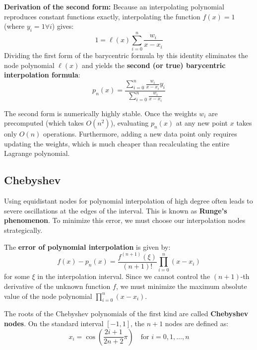 \begin{theorem}
    \textbf{Derivation of the second form:} Because an interpolating polynomial reproduces constant functions exactly, interpolating the function $f(x) = 1$ (where $y_i = 1 \forall i$) gives:
    $$1 = \ell(x) \sum_{i=0}^{n} \frac{w_i}{x - x_i}$$
    Dividing the first form of the barycentric formula by this identity eliminates the node polynomial $\ell(x)$ and yields the \textbf{second (or true) barycentric interpolation formula}:
    $$p_n(x) = \frac{\sum_{i=0}^{n} \frac{w_i}{x - x_i} y_i}{\sum_{i=0}^{n} \frac{w_i}{x - x_i}}$$
\end{theorem}

\begin{remark}
    The second form is numerically highly stable. Once the weights $w_i$ are precomputed (which takes $O(n^2)$), evaluating $p_n(x)$ at any new point $x$ takes only $O(n)$ operations. Furthermore, adding a new data point only requires updating the weights, which is much cheaper than recalculating the entire Lagrange polynomial.
\end{remark}

\subsection{Chebyshev}

\begin{definition}
    Using equidistant nodes for polynomial interpolation of high degree often leads to severe oscillations at the edges of the interval. This is known as \textbf{Runge's phenomenon}. To minimize this error, we must choose our interpolation nodes strategically.
\end{definition}

\begin{theorem}
    The \textbf{error of polynomial interpolation} is given by:
    $$f(x) - p_n(x) = \frac{f^{(n+1)}(\xi)}{(n+1)!} \prod_{i=0}^{n} (x - x_i)$$
    for some $\xi$ in the interpolation interval. Since we cannot control the $(n+1)$-th derivative of the unknown function $f$, we must minimize the maximum absolute value of the node polynomial $\prod_{i=0}^{n} (x - x_i)$.
\end{theorem}

\begin{definition}
    The roots of the Chebyshev polynomials of the first kind are called \textbf{Chebyshev nodes}. On the standard interval $[-1, 1]$, the $n+1$ nodes are defined as:
    $$x_i = \cos\left(\frac{2i + 1}{2n + 2}\pi\right) \quad \text{for } i = 0, 1, \dots, n$$
\end{definition}

